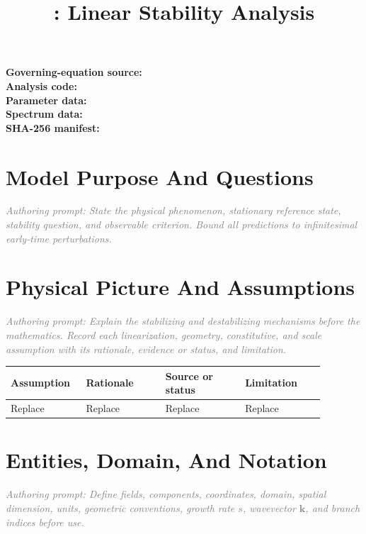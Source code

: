 \documentclass[11pt]{article}
\title{\modelname: Linear Stability Analysis}
\author{}
\date{}
\newcommand{\authorprompt}[1]{\textcolor{gray}{\emph{Authoring prompt: #1}}}
\newcommand{\vect}[1]{\bm{#1}}
\begin{document}
\maketitle

\noindent\textbf{Governing-equation source:} \\
\textbf{Analysis code:} \\
\textbf{Parameter data:} \\
\textbf{Spectrum data:} \\
\textbf{SHA-256 manifest:} 

\section{Model Purpose And Questions}

\authorprompt{State the physical phenomenon, stationary reference state, stability question, and observable criterion. Bound all predictions to infinitesimal early-time perturbations.}

\section{Physical Picture And Assumptions}

\authorprompt{Explain the stabilizing and destabilizing mechanisms before the mathematics. Record each linearization, geometry, constitutive, and scale assumption with its rationale, evidence or status, and limitation.}

\begin{center}
\begin{tabular}{p{0.19\linewidth}p{0.23\linewidth}p{0.23\linewidth}p{0.23\linewidth}}
\toprule
Assumption & Rationale & Source or status & Limitation \\
\midrule
Replace & Replace & Replace & Replace \\
\bottomrule
\end{tabular}
\end{center}

\section{Entities, Domain, And Notation}

\authorprompt{Define fields, components, coordinates, domain, spatial dimension, units, geometric conventions, growth rate $s$, wavevector $\vect{k}$, and branch indices before use.}
\end{document}
